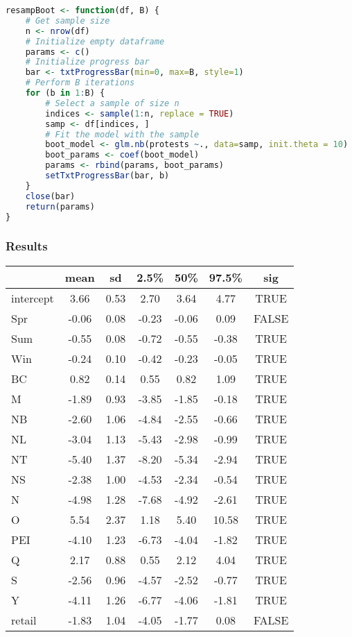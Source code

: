 \documentclass[12pt]{article}
\begin{document}
\vspace{1cm}
\begin{lstlisting}[language=R]
resampBoot <- function(df, B) {
    # Get sample size
    n <- nrow(df)
    # Initialize empty dataframe
    params <- c()
    # Initialize progress bar
    bar <- txtProgressBar(min=0, max=B, style=1)
    # Perform B iterations
    for (b in 1:B) {
        # Select a sample of size n
        indices <- sample(1:n, replace = TRUE)
        samp <- df[indices, ]
        # Fit the model with the sample
        boot_model <- glm.nb(protests ~., data=samp, init.theta = 10)
        boot_params <- coef(boot_model)
        params <- rbind(params, boot_params)
        setTxtProgressBar(bar, b)
    }
    close(bar)
    return(params)
}
\end{lstlisting}

\subsubsection*{Results}
\begin{table}[hbt!]
    \centering
    \begin{tabular}{|l|c|c|c|c|c|c|}
      \hline
     & mean & sd & 2.5\% & 50\% & 97.5\% & sig \\ 
      \hline
    intercept & 3.66 & 0.53 & 2.70 & 3.64 & 4.77 & TRUE \\ 
      Spr & -0.06 & 0.08 & -0.23 & -0.06 & 0.09 & FALSE \\ 
      Sum & -0.55 & 0.08 & -0.72 & -0.55 & -0.38 & TRUE \\ 
      Win & -0.24 & 0.10 & -0.42 & -0.23 & -0.05 & TRUE \\ 
      BC & 0.82 & 0.14 & 0.55 & 0.82 & 1.09 & TRUE \\ 
      M & -1.89 & 0.93 & -3.85 & -1.85 & -0.18 & TRUE \\ 
      NB & -2.60 & 1.06 & -4.84 & -2.55 & -0.66 & TRUE \\ 
      NL & -3.04 & 1.13 & -5.43 & -2.98 & -0.99 & TRUE \\ 
      NT & -5.40 & 1.37 & -8.20 & -5.34 & -2.94 & TRUE \\ 
      NS & -2.38 & 1.00 & -4.53 & -2.34 & -0.54 & TRUE \\ 
      N & -4.98 & 1.28 & -7.68 & -4.92 & -2.61 & TRUE \\ 
      O & 5.54 & 2.37 & 1.18 & 5.40 & 10.58 & TRUE \\ 
      PEI & -4.10 & 1.23 & -6.73 & -4.04 & -1.82 & TRUE \\ 
      Q & 2.17 & 0.88 & 0.55 & 2.12 & 4.04 & TRUE \\ 
      S & -2.56 & 0.96 & -4.57 & -2.52 & -0.77 & TRUE \\ 
      Y & -4.11 & 1.26 & -6.77 & -4.06 & -1.81 & TRUE \\ 
      retail & -1.83 & 1.04 & -4.05 & -1.77 & 0.08 & FALSE \\ 
       \hline
    \end{tabular}
\end{table}
\newpage
\end{document}
